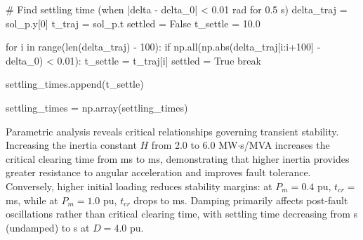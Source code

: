 \documentclass[11pt,a4paper]{article}
\begin{document}
\begin{pycode}
    # Find settling time (when |delta - delta_0| < 0.01 rad for 0.5 s)
    delta_traj = sol_p.y[0]
    t_traj = sol_p.t
    settled = False
    t_settle = 10.0

    for i in range(len(delta_traj) - 100):
        if np.all(np.abs(delta_traj[i:i+100] - delta_0) < 0.01):
            t_settle = t_traj[i]
            settled = True
            break

    settling_times.append(t_settle)

settling_times = np.array(settling_times)
\end{pycode}

Parametric analysis reveals critical relationships governing transient stability. Increasing the inertia constant $H$ from 2.0 to 6.0 MW$\cdot$s/MVA increases the critical clearing time from  ms to  ms, demonstrating that higher inertia provides greater resistance to angular acceleration and improves fault tolerance. Conversely, higher initial loading reduces stability margins: at $P_m = 0.4$ pu, $t_{cr} = $  ms, while at $P_m = 1.0$ pu, $t_{cr}$ drops to  ms. Damping primarily affects post-fault oscillations rather than critical clearing time, with settling time decreasing from  s (undamped) to  s at $D = 4.0$ pu.
\end{document}
